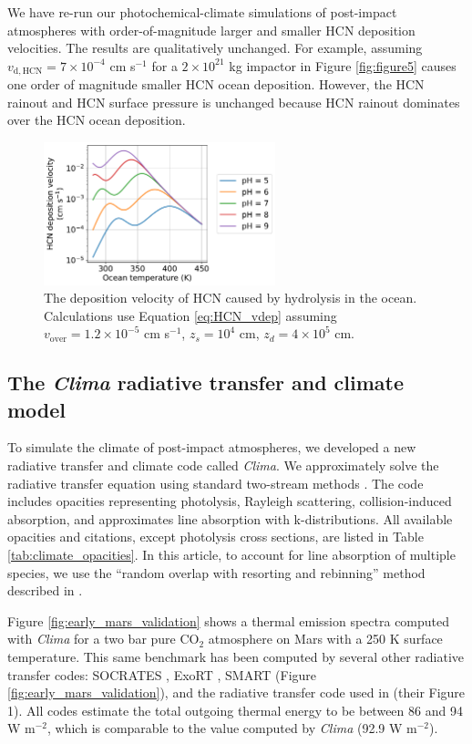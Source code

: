 We have re-run our photochemical-climate simulations of post-impact atmospheres with order-of-magnitude larger and smaller HCN deposition velocities. The results are qualitatively unchanged. For example, assuming $v_\mathrm{d,HCN} = 7 \times 10^{-4}$ cm s$^{-1}$ for a $2 \times 10^{21}$ kg impactor in Figure \ref{fig:figure5} causes one order of magnitude smaller HCN ocean deposition. However, the HCN rainout and HCN surface pressure is unchanged because HCN rainout dominates over the HCN ocean deposition.

\begin{figure}
  \centering
  \includegraphics[width=0.6\textwidth]{tex/5impacts/figures/supplement/vdep_HCN.pdf}
  \caption{The deposition velocity of HCN caused by hydrolysis in the ocean. Calculations use Equation \eqref{eq:HCN_vdep} assuming $v_\mathrm{over} = 1.2 \times 10^{-5}$ cm s$^{-1}$, $z_s = 10^{4}$ cm, $z_d = 4 \times 10^{5}$ cm.}
  \label{fig:vdep_hcn}
\end{figure}

\subsection{The \emph{Clima} radiative transfer and climate model} \label{sec:clima}

To simulate the climate of post-impact atmospheres, we developed a new radiative transfer and climate code called \emph{Clima}. We approximately solve the radiative transfer equation using standard two-stream methods \citep{Toon_1989}. The code includes opacities representing photolysis, Rayleigh scattering, collision-induced absorption, and approximates line absorption with k-distributions. All available opacities and citations, except photolysis cross sections, are listed in Table \ref{tab:climate_opacities}. In this article, to account for line absorption of multiple species, we use the ``random overlap with resorting and rebinning'' method described in \citet{Amundsen_2017}. 

Figure \ref{fig:early_mars_validation} shows a thermal emission spectra computed with \emph{Clima} for a two bar pure CO$_2$ atmosphere on Mars with a 250 K surface temperature. This same benchmark has been computed by several other radiative transfer codes: SOCRATES \citep[Figure 2]{Wolf_2022}, ExoRT \citep[Figure 2]{Wolf_2022}, SMART (Figure \ref{fig:early_mars_validation}), and the radiative transfer code used in \citet{Kopparapu_2013} (their Figure 1). All codes estimate the total outgoing thermal energy to be between 86 and 94 W m$^{-2}$, which is comparable to the value computed by \emph{Clima} (92.9 W m$^{-2}$).

